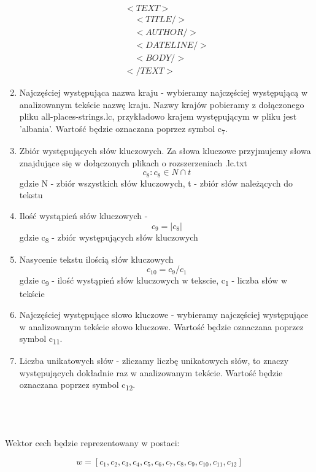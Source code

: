 \documentclass{classrep}
\begin{document}
\begin{enumerate}
\begin{equation}
  \begin{array}{l}
  <TEXT> \\
\;\;\;\; <TITLE/>\\
\;\;\;\; <AUTHOR/>\\
\;\;\;\; <DATELINE/>\\
 \;\;\;\;<BODY/> \\
</TEXT>
  \end{array}
\end{equation}
  \item Najczęściej występująca nazwa kraju - wybieramy najczęściej występującą w analizowanym tekście nazwę kraju. Nazwy krajów pobieramy z dołączonego pliku all-places-strings.lc, przykładowo krajem występującym w pliku jest 'albania'. Wartość będzie oznaczana poprzez symbol  c\textsubscript{7}.
  \item Zbiór występujących słów kluczowych. Za słowa kluczowe przyjmujemy słowa znajdujące się w dołączonych plikach o rozszerzeniach .lc.txt  \begin{equation}  c_8 : c_8 \in N \cap t \end{equation} gdzie N - zbiór wszystkich słów kluczowych, t - zbiór słów należących do tekstu
  \item Ilość wystąpień słów kluczowych - \begin{equation}  c_9 = | c_8 | \end{equation} gdzie c\textsubscript{8} - zbiór występujących słów kluczowych
  \item Nasycenie tekstu ilością słów kluczowych  \begin{equation} c_{10} = c_9 / c_1 \end{equation}  gdzie c\textsubscript{9} - ilość wystąpień słów kluczowych w tekscie, c\textsubscript{1} - liczba słów w tekście
  \item Najczęściej występujące słowo kluczowe - wybieramy najczęściej występujące w analizowanym tekście słowo kluczowe. Wartość będzie oznaczana poprzez symbol  c\textsubscript{11}.
  \item Liczba unikatowych słów - zliczamy liczbę unikatowych słów, to znaczy występujących dokładnie raz w analizowanym tekście. Wartość będzie oznaczana poprzez symbol  c\textsubscript{12}.
\end{enumerate}

\ \\ \\ \\
Wektor cech będzie reprezentowany w postaci: 

\begin{equation} w = [c_1, c_2, c_3, c_4, c_5, c_6, c_7, c_8, c_9, c_{10}, c_{11}, c_{12}] \end{equation}
\end{document}

